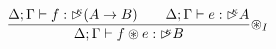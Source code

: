 \[
\frac { \Delta ;\Gamma \vdash f: \laterkappa(A\rightarrow B)\quad \quad \Delta;\Gamma \vdash e : \laterkappa A }{ \Delta;\Gamma \vdash f \tensor e : \laterkappa B } { \tensor }_{ I }
\]
